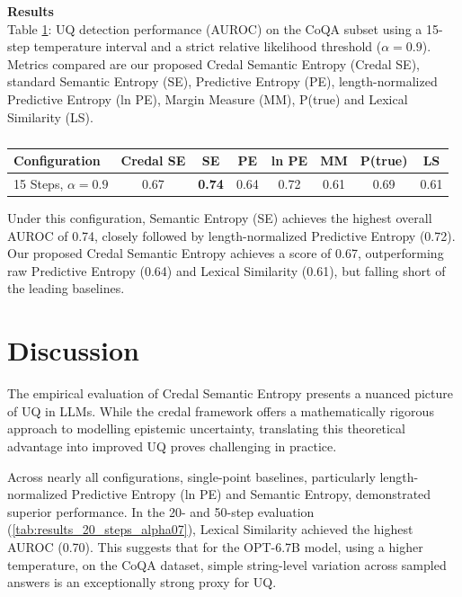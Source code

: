 \textbf{Results} \\
Table \ref{tab:results_opt_sem_entropy}:
	UQ detection performance (AUROC) on the CoQA subset
	using a 15-step temperature interval and a strict relative
	likelihood threshold ($\alpha=0.9$). Metrics compared are our
	proposed Credal Semantic Entropy (Credal SE), standard Semantic
	Entropy (SE), Predictive Entropy (PE), length-normalized Predictive
	Entropy (ln PE), Margin Measure (MM), P(true) and
	Lexical Similarity (LS).
\begin{table}[h]
    \centering
    \begin{tabular}{lccccccc}
        \toprule
	\textbf{Configuration} & \textbf{Credal SE} & \textbf{SE} & \textbf{PE} & \textbf{ln PE} & \textbf{MM} & \textbf{P(true)} &\textbf{LS}\\
        \midrule
    15 Steps, $\alpha = 0.9$ & 0.67 & \textbf{0.74} & 0.64 & 0.72 & 0.61 & 0.69 &0.61\\
        \bottomrule
    \end{tabular}
    \caption{}
    \label{tab:results_opt_sem_entropy}
\end{table}

Under this configuration, Semantic Entropy (SE) achieves the 
highest overall AUROC of 0.74, closely followed by 
length-normalized Predictive Entropy (0.72). Our proposed Credal Semantic
Entropy achieves a score of 0.67, outperforming raw Predictive Entropy 
(0.64) and Lexical Similarity (0.61), but falling short of the leading 
baselines.

\section{Discussion}
\label{sec:experiments:discussion}
The empirical evaluation of Credal Semantic Entropy
presents a nuanced picture of UQ
in LLMs. While the credal framework offers a mathematically
rigorous approach to modelling epistemic uncertainty,
translating this theoretical advantage into improved
UQ proves challenging in practice.

Across nearly all configurations, single-point baselines, 
particularly length-normalized Predictive Entropy (ln PE) and
Semantic Entropy, demonstrated superior performance.
In the 20- and 50-step evaluation (\ref{tab:results_20_steps_alpha07}),
Lexical Similarity achieved the highest AUROC (0.70). 
This suggests that for the OPT-6.7B model, using a higher temperature,
on the CoQA dataset,
simple string-level variation across sampled answers is an
exceptionally strong proxy for UQ.

